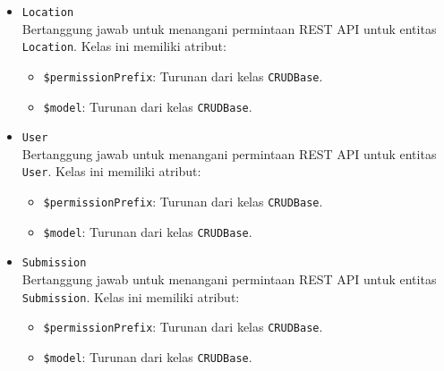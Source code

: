 \begin{itemize}
        \item \texttt{Location}\\
            Bertanggung jawab untuk menangani permintaan REST API untuk entitas \texttt{Location}. 
            Kelas ini memiliki atribut:
            \begin{itemize}
                \item \texttt{\$permissionPrefix}: Turunan dari kelas \texttt{CRUDBase}.
                \item \texttt{\$model}: Turunan dari kelas \texttt{CRUDBase}.
            \end{itemize}
        
        \item \texttt{User}\\
            Bertanggung jawab untuk menangani permintaan REST API untuk entitas \texttt{User}. 
            Kelas ini memiliki atribut:
            \begin{itemize}
                \item \texttt{\$permissionPrefix}: Turunan dari kelas \texttt{CRUDBase}.
                \item \texttt{\$model}: Turunan dari kelas \texttt{CRUDBase}.
            \end{itemize}
        
        \item \texttt{Submission}\\
            Bertanggung jawab untuk menangani permintaan REST API untuk entitas 
            \texttt{Submission}. 
            Kelas ini memiliki atribut:
            \begin{itemize}
                \item \texttt{\$permissionPrefix}: Turunan dari kelas \texttt{CRUDBase}.
                \item \texttt{\$model}: Turunan dari kelas \texttt{CRUDBase}.
            \end{itemize}
        

\end{itemize}
